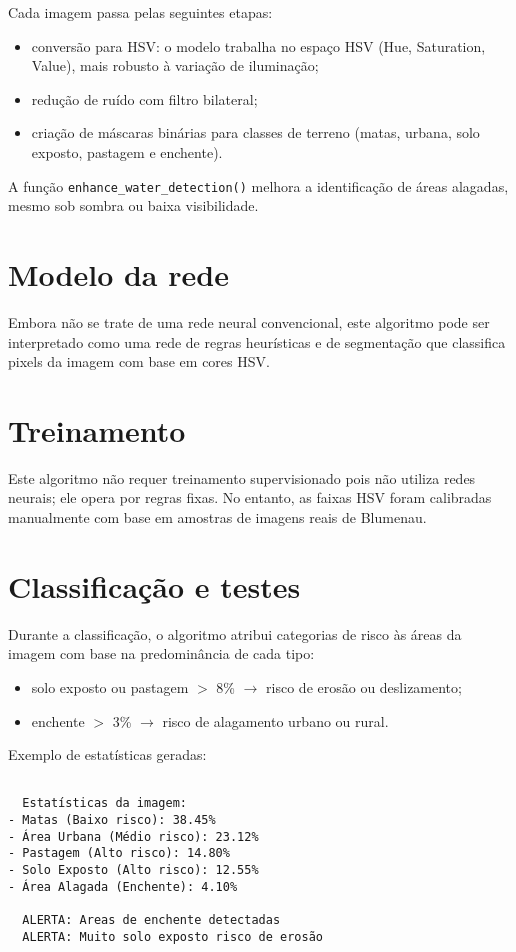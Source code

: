 \documentclass{article}
\begin{document}
Cada imagem passa pelas seguintes etapas:
\begin{itemize}
    \item conversão para HSV: o modelo trabalha no espaço HSV (Hue, Saturation, Value), mais robusto à variação de iluminação;
    \item redução de ruído com filtro bilateral;
    \item criação de máscaras binárias para classes de terreno (matas, urbana, solo exposto, pastagem e enchente).
\end{itemize}

A função \texttt{enhance\_water\_detection()} melhora a identificação de áreas alagadas, mesmo sob sombra ou baixa visibilidade.

\section{Modelo da rede}

Embora não se trate de uma rede neural convencional, este algoritmo pode ser interpretado como uma rede de regras heurísticas e de segmentação que classifica pixels da imagem com base em cores HSV.

\section{Treinamento}

Este algoritmo não requer treinamento supervisionado pois não utiliza redes neurais; ele opera por regras fixas. No entanto, as faixas HSV foram calibradas manualmente com base em amostras de imagens reais de Blumenau.

\section{Classificação e testes}

Durante a classificação, o algoritmo atribui categorias de risco às áreas da imagem com base na predominância de cada tipo:
\begin{itemize}
    \item solo exposto ou pastagem $>$ 8\% $\rightarrow$ risco de erosão ou deslizamento;
    \item enchente $>$ 3\% $\rightarrow$ risco de alagamento urbano ou rural.
\end{itemize}

Exemplo de estatísticas geradas:

\begin{verbatim}

  Estatísticas da imagem:
- Matas (Baixo risco): 38.45%
- Área Urbana (Médio risco): 23.12%
- Pastagem (Alto risco): 14.80%
- Solo Exposto (Alto risco): 12.55%
- Área Alagada (Enchente): 4.10%

  ALERTA: Areas de enchente detectadas
  ALERTA: Muito solo exposto risco de erosão

\end{verbatim}
\end{document}
